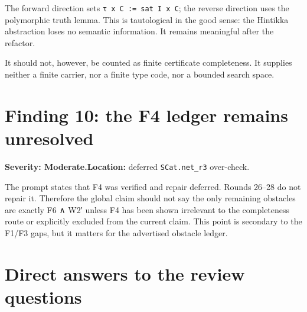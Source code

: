 \documentclass[11pt]{article}
\newcommand{\sev}[1]{\textbf{Severity: #1}}
\begin{document}
The forward direction sets \texttt{τ x C := sat I x C}; the reverse direction uses the polymorphic truth lemma. This is tautological in the good sense: the Hintikka abstraction loses no semantic information. It remains meaningful after the refactor.

It should not, however, be counted as finite certificate completeness. It supplies neither a finite carrier, nor a finite type code, nor a bounded search space.

\section{Finding 10: the F4 ledger remains unresolved}

\sev{Moderate.}\quad \textbf{Location:} deferred \texttt{SCat.net\_r3} over-check.

The prompt states that F4 was verified and repair deferred. Rounds 26--28 do not repair it. Therefore the global claim should not say the only remaining obstacles are exactly F6 ∧ W2′ unless F4 has been shown irrelevant to the completeness route or explicitly excluded from the current claim. This point is secondary to the F1/F3 gaps, but it matters for the advertised obstacle ledger.

\section{Direct answers to the review questions}
\end{document}
